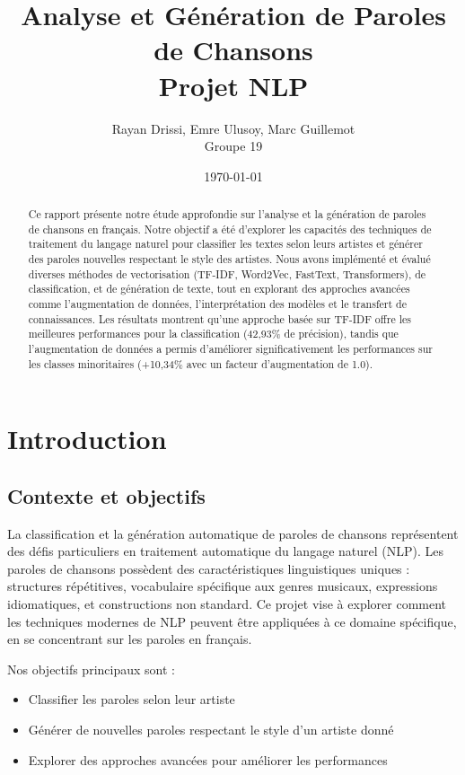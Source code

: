 \documentclass[a4paper,11pt]{article}
\title{\textbf{Analyse et Génération de Paroles de Chansons\\
Projet NLP}}
\author{Rayan Drissi, Emre Ulusoy, Marc Guillemot\\
Groupe 19}
\date{\today}
\begin{document}
\maketitle

\begin{abstract}
Ce rapport présente notre étude approfondie sur l'analyse et la génération de paroles de chansons en français. Notre objectif a été d'explorer les capacités des techniques de traitement du langage naturel pour classifier les textes selon leurs artistes et générer des paroles nouvelles respectant le style des artistes. Nous avons implémenté et évalué diverses méthodes de vectorisation (TF-IDF, Word2Vec, FastText, Transformers), de classification, et de génération de texte, tout en explorant des approches avancées comme l'augmentation de données, l'interprétation des modèles et le transfert de connaissances. Les résultats montrent qu'une approche basée sur TF-IDF offre les meilleures performances pour la classification (42,93\% de précision), tandis que l'augmentation de données a permis d'améliorer significativement les performances sur les classes minoritaires (+10,34\% avec un facteur d'augmentation de 1.0).
\end{abstract}

\newpage

\tableofcontents
\newpage

\section{Introduction}
\subsection{Contexte et objectifs}
La classification et la génération automatique de paroles de chansons représentent des défis particuliers en traitement automatique du langage naturel (NLP). Les paroles de chansons possèdent des caractéristiques linguistiques uniques : structures répétitives, vocabulaire spécifique aux genres musicaux, expressions idiomatiques, et constructions non standard. Ce projet vise à explorer comment les techniques modernes de NLP peuvent être appliquées à ce domaine spécifique, en se concentrant sur les paroles en français.

Nos objectifs principaux sont :
\begin{itemize}
    \item Classifier les paroles selon leur artiste
    \item Générer de nouvelles paroles respectant le style d'un artiste donné
    \item Explorer des approches avancées pour améliorer les performances
\end{itemize}
\end{document}
